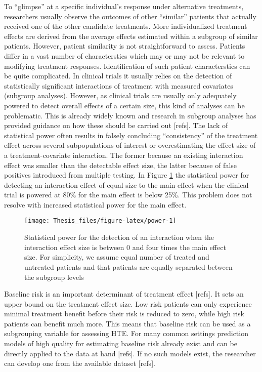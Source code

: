 \documentclass[
]{book}
\begin{document}
To ``glimpse'' at a specific individual's response under alternative treatments,
researchers usually observe the outcomes of other ``similar'' patients that
actually received one of the other candidate treatments. More individualized
treatment effects are derived from the average effects estimated within a
subgroup of similar patients. However, patient similarity is not straightforward
to assess. Patients differ in a vast number of characterstics which may or may
not be relevant to modifying treatment responses. Identification of such patient
characterstics can be quite complicated. In clinical trials it usually relies on
the detection of statistically significant interactions of treatment with
measured covariates (subgroup analyses). However, as clinical trials are usually
only adequately powered to detect overall effects of a certain size, this kind
of analyses can be problematic. This is already widely known and research in
subgroup analyses has provided guidance on how these should be carried out
{[}refs{]}. The lack of statistical power often results in falsely concluding
``consistency'' of the treatment effect across several subpopulations of interest
or overestimating the effect size of a treatment-covariate interaction. The
former because an existing interaction effect was smaller than the detectable
effect size, the latter because of false positives introduced from multiple
testing. In Figure \ref{fig:power} the statistical power for detecting an
interaction effect of equal size to the main effect when the clinical trial is
powered at 80\% for the main effect is below 25\%. This problem does not resolve
with increased statistical power for the main effect.

\begin{figure}
\texttt{[image: Thesis\_files/figure-latex/power-1]} \caption{Statistical power for the detection of an interaction when the interaction effect size is between 0 and four times the main effect size. For simplicity, we assume equal number of treated and untreated patients and that patients are equally separated between the subgroup levels}\label{fig:power}
\end{figure}

Baseline risk is an important determinant of treatment effect {[}refs{]}. It sets an
upper bound on the treatment effect size. Low risk patients can only experience
minimal treatment benefit before their risk is reduced to zero, while high risk
patients can benefit much more. This means that baseline risk can be used as a
subgrouping variable for assessing HTE. For many common settings prediction
models of high quality for estimating baseline risk already exist and can be
directly applied to the data at hand {[}refs{]}. If no such models exist, the
researcher can develop one from the available dataset {[}refs{]}.
\end{document}
